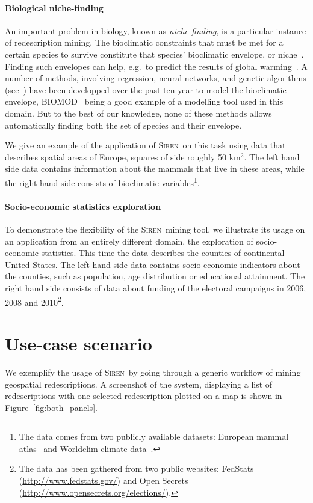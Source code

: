 \documentclass{sig-alternate}
\newcommand{\prg}[1]{\paragraph{#1}}
\newcommand{\Siren}{\textsc{Siren}}
\begin{document}
\prg{Biological niche-finding} 
An important problem in biology, known as \emph{niche-finding}, is a
particular instance of redescription mining.  The bioclimatic
constraints that must be met for a certain species to survive
constitute that species' bioclimatic envelope, or
niche~\cite{grinnell17niche}.  Finding such envelopes can help, e.g.\
to predict the results of global warming~\cite{pearson03predicting}.
A number of methods, involving regression, neural networks, and
genetic algorithms (see~\cite{soberon05interpretation}) have been
developped over the past ten year to model the bioclimatic envelope,
\textsc{BIOMOD}~\cite{thuiller09biomod} being a good example of a
modelling tool used in this domain.  But to the best of our knowledge,
none of these methods allows automatically finding both the set of
species and their envelope.

We give an example of the application of \Siren\ on this task using data
that describes spatial areas of Europe, squares of side roughly 50
km$^2$.  The left hand side data contains information about the
mammals that live in these areas, while the right hand side consists
of bioclimatic variables\footnote{The data comes from two publicly available
datasets: European mammal atlas~\cite{mitchell-jones99atlas} and
Worldclim climate data~\cite{hijmans05very}.}.

\prg{Socio-economic statistics exploration}


To demonstrate the flexibility of the \Siren\ mining tool, we illustrate its usage on
an application from an entirely different domain, the exploration of socio-economic statistics. This time the data describes the counties
of continental United-States.  The left hand side data
contains socio-economic indicators about the counties, such as
population, age distribution or educational attainment. The right hand
side consists of data about funding of the electoral campaigns in
2006, 2008 and 2010\footnote{The data has been gathered from two public
websites: FedStats (\url{http://www.fedstats.gov/}) and Open
Secrets (\url{http://www.opensecrets.org/elections/}).}.


\section{Use-case scenario}
\label{sec:scenarios}
We exemplify the usage of \Siren\ by going through a generic workflow of
mining geospatial redescriptions.  A screenshot of the system,
displaying a list of redescriptions with one
selected redescription plotted on a map is shown in
Figure~\ref{fig:both_panels}.
\end{document}

